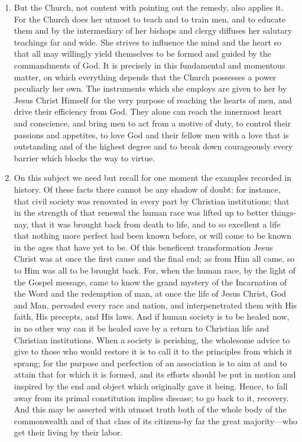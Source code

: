\documentclass{book}
\begin{document}
\begin{enumerate}
	\item But the Church, not content with pointing out the remedy, also applies it. For the Church does her utmost to teach and to train men, and to educate them and by the intermediary of her bishops and clergy diffuses her salutary teachings far and wide. She strives to influence the mind and the heart so that all may willingly yield themselves to be formed and guided by the commandments of God. It is precisely in this fundamental and momentous matter, on which everything depends that the Church possesses a power peculiarly her own. The instruments which she employs are given to her by Jesus Christ Himself for the very purpose of reaching the hearts of men, and drive their efficiency from God. They alone can reach the innermost heart and conscience, and bring men to act from a motive of duty, to control their passions and appetites, to love God and their fellow men with a love that is outstanding and of the highest degree and to break down courageously every barrier which blocks the way to virtue.


	\item On this subject we need but recall for one moment the examples recorded in history. Of these facts there cannot be any shadow of doubt: for instance, that civil society was renovated in every part by Christian institutions; that in the strength of that renewal the human race was lifted up to better things-nay, that it was brought back from death to life, and to so excellent a life that nothing more perfect had been known before, or will come to be known in the ages that have yet to be. Of this beneficent transformation Jesus Christ was at once the first cause and the final end; as from Him all came, so to Him was all to be brought back. For, when the human race, by the light of the Gospel message, came to know the grand mystery of the Incarnation of the Word and the redemption of man, at once the life of Jesus Christ, God and Man, pervaded every race and nation, and interpenetrated them with His faith, His precepts, and His laws. And if human society is to be healed now, in no other way can it be healed save by a return to Christian life and Christian institutions. When a society is perishing, the wholesome advice to give to those who would restore it is to call it to the principles from which it sprang; for the purpose and perfection of an association is to aim at and to attain that for which it is formed, and its efforts should be put in motion and inspired by the end and object which originally gave it being. Hence, to fall away from its primal constitution implies disease; to go back to it, recovery. And this may be asserted with utmost truth both of the whole body of the commonwealth and of that class of its citizens-by far the great majority—who get their living by their labor.



\end{enumerate}
\end{document}
